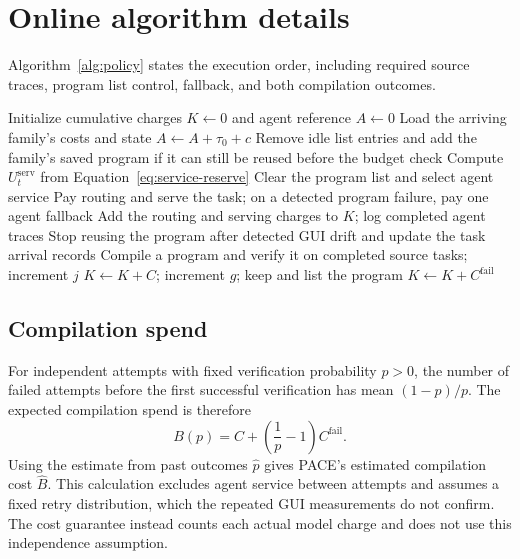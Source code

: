 \section{Online algorithm details}\label{app:protocol-details}

Algorithm~\ref{alg:policy} states the execution order, including required source traces, program list control, fallback, and both compilation outcomes.
\begin{algorithm}[htbp]
\caption{PACE with extra-cost margin $\epsilon$.
Family identities, cost profiles, routing charges, and the probability of GUI drift are given.}
\label{alg:policy}
\begin{algorithmic}[1]
\State Initialize cumulative charges $K\gets0$ and agent reference $A\gets0$
\State Load the arriving family's costs and state
\State $A\gets A+\tau_0+c$
\State Remove idle list entries and add the family's saved program if it can still be reused before the budget check
\State Compute $U_t^{\mathrm{serv}}$ from Equation~\ref{eq:service-reserve}
\State Clear the program list and select agent service
\EndIf
\State Pay routing and serve the task; on a detected program failure, pay one agent fallback
\State Add the routing and serving charges to $K$; log completed agent traces
\State Stop reusing the program after detected GUI drift and update the task arrival records
\State Compile a program and verify it on completed source tasks; increment $j$
\State $K\gets K+C$; increment $g$; keep and list the program
\Else
\State $K\gets K+C^{\mathrm{fail}}$
\EndIf
\EndIf
\EndIf
\EndFor
\end{algorithmic}
\end{algorithm}

\subsection{Compilation spend}
\label{app:reference}
For independent attempts with fixed verification probability $p>0$, the number of failed attempts before the first successful verification has mean $(1-p)/p$.
The expected compilation spend is therefore
\begin{equation}
B(p)=C+\left(\frac1p-1\right)C^{\mathrm{fail}}.
\label{eq:compile-spend}
\end{equation}
Using the estimate from past outcomes $\hat p$ gives PACE's estimated compilation cost $\hat B$.
This calculation excludes agent service between attempts and assumes a fixed retry distribution, which the repeated GUI measurements do not confirm.
The cost guarantee instead counts each actual model charge and does not use this independence assumption.

